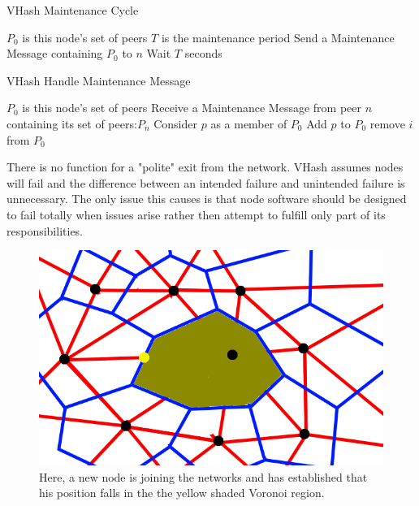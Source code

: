 \documentclass{IEEEtran}
\begin{document}
\begin{algorithm}
\caption{VHash Maintenance Cycle}
\label{maint}
\begin{algorithmic}[1]  %
	\STATE $P_0$ is this node's set of peers
    \STATE $T$ is the maintenance period
        	\STATE Send a Maintenance Message containing $P_0$ to $n$
        \ENDFOR
    \STATE Wait $T$ seconds
    \ENDWHILE
\end{algorithmic}
\end{algorithm}


\begin{algorithm}
\caption{VHash Handle Maintenance Message}
\label{handlemaint}
\begin{algorithmic}[1]  %
	\STATE $P_0$ is this node's set of peers
	\STATE Receive a Maintenance Message from peer $n$ containing its set of peers:$P_n$
    	\STATE Consider $p$ as a member of $P_0$
        	\STATE Add $p$ to $P_0$
                	\STATE remove $i$ from $P_0$
                \ENDIF
            \ENDFOR
        \ENDIF
    \ENDFOR
\end{algorithmic}
\end{algorithm}

There is no function for a "polite" exit from the network. VHash  assumes nodes will fail and the difference between an intended failure and unintended failure is unnecessary. The only issue this causes is that node software should be designed to fail totally when issues arise rather then attempt to fulfill only part of its responsibilities.  


\begin{figure}
    \includegraphics[width=\linewidth]{voronoi-churn4}
    \caption{Here, a new node is joining the networks and has established that his position falls in the the yellow shaded Voronoi region.}
    \label{churnjoin}
\end{figure}
\end{document}
